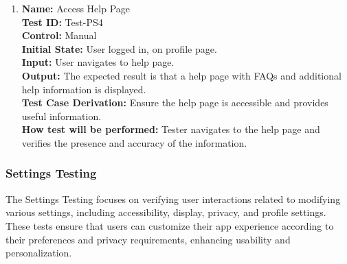 \documentclass[12pt, titlepage]{article}
\begin{document}
\begin{enumerate}
  \item \textbf{Name:} {Access Help Page} \label{itm:Test-PS4}\\
        \textbf{Test ID:} Test-PS4\\
        \textbf{Control:} Manual \\
        \textbf{Initial State:} User logged in, on profile page. \\
        \textbf{Input:} User navigates to help page. \\
        \textbf{Output:} The expected result is that a help page with FAQs and additional help information is displayed. \\
        \textbf{Test Case Derivation:} Ensure the help page is accessible and provides useful information. \\
        \textbf{How test will be performed:} Tester navigates to the help page and verifies the presence and accuracy of the information.
\end{enumerate}

\subsubsection{Settings Testing}
\label{sec:settings_testing}

The Settings Testing focuses on verifying user interactions related to modifying various settings, including accessibility, display, privacy, and profile settings. These tests ensure that users can customize their app experience according to their preferences and privacy requirements, enhancing usability and personalization.
\end{document}
